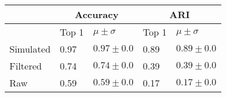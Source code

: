 \begin{tabular}{lllll}
\toprule
{} & \multicolumn{2}{c}{Accuracy} &   \multicolumn{2}{c}{ARI} \\
\midrule
{} & Top 1 & $\mu \pm \sigma$ & Top 1 & $\mu \pm \sigma$ \\
Simulated &  0.97 &  $0.97 \pm 0.0$ &  0.89 & $0.89\pm 0.0$ \\
Filtered  &   0.74 & $0.74\pm 0.0$ &  0.39 &$0.39\pm 0.0$ \\
Raw &   0.59 &  $0.59\pm 0.0$ & 0.17& $0.17\pm 0.0$ \\
\bottomrule
\end{tabular}

